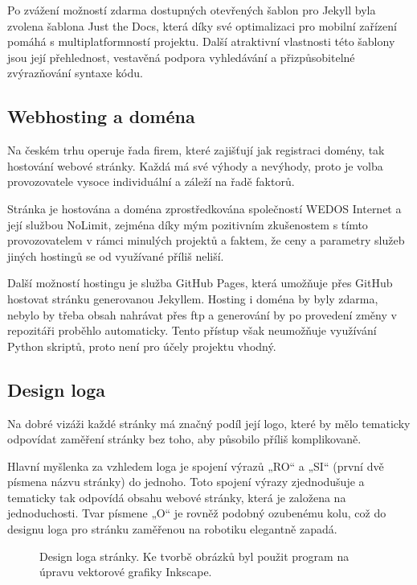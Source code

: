 \documentclass[a4paper, 12pt]{article}
\begin{document}
  Po zvážení možností zdarma dostupných otevřených šablon pro Jekyll byla zvolena šablona Just the Docs, která díky své optimalizaci pro mobilní zařízení pomáhá s multiplatformností projektu. Další atraktivní vlastnosti této šablony jsou její přehlednost, vestavěná podpora vyhledávání a přizpůsobitelné zvýrazňování syntaxe kódu.


  \subsection{Webhosting a doména} \label{sec:Webhosting a doména}
  Na českém trhu operuje řada firem, které zajišťují jak registraci domény, tak hostování webové stránky. Každá má své výhody a nevýhody, proto je volba provozovatele vysoce individuální a záleží na řadě faktorů.

  Stránka je hostována a doména zprostředkována společností WEDOS Internet a její službou NoLimit, zejména díky mým pozitivním zkušenostem s tímto provozovatelem v rámci minulých projektů a faktem, že ceny a parametry služeb jiných hostingů se od využívané příliš neliší.

  Další možností hostingu je služba GitHub Pages, která umožňuje přes GitHub hostovat stránku generovanou Jekyllem. Hosting i doména by byly zdarma, nebylo by třeba obsah nahrávat přes \acrshort{ftp} a generování by po provedení změny v repozitáři proběhlo automaticky. Tento přístup však neumožňuje využívání Python skriptů, proto není pro účely projektu vhodný.


  \subsection{Design loga}
  Na dobré vizáži každé stránky má značný podíl její logo, které by mělo tematicky odpovídat zaměření stránky bez toho, aby působilo příliš komplikovaně.

  Hlavní myšlenka za vzhledem loga je spojení výrazů „RO“ a „SI“ (první dvě písmena názvu stránky) do jednoho. Toto spojení výrazy zjednodušuje a tematicky tak odpovídá obsahu webové stránky, která je založena na jednoduchosti. Tvar písmene „O“ je rovněž podobný ozubenému kolu, což do designu loga pro stránku zaměřenou na robotiku elegantně zapadá.

  \begin{figure}[H]%
    \centering

    \hfill
    \hfill

    \caption[Design loga stránky]{Design loga stránky. Ke tvorbě obrázků byl použit program na úpravu vektorové grafiky Inkscape.}%
    \label{img:Design loga stránky}%
  \end{figure}
\end{document}
